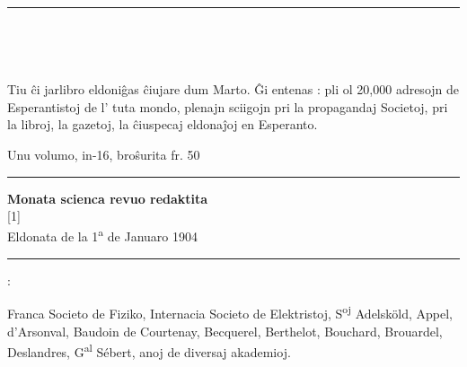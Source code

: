 %
%
\thispagestyle{plain}
{\centering
{\footnotesize {}\par}
\rule[0.9ex]{\textwidth}{0.4pt}

{}\\[1ex]
\parbox{0.7\textwidth}{}\\[1ex]
{\footnotesize{}}\par

{\par}
}

{\footnotesize Tiu ĉi jarlibro eldoniĝas ĉiujare dum Marto.  Ĝi entenas : pli ol 20,000 adresojn de Esperantistoj de l’ tuta mondo, plenajn sciigojn pri la propagandaj Societoj, pri la libroj, la gazetoj, la ĉiuspecaj eldonaĵoj en Esperanto.}

\newlength{\tempindent}
\setlength{\tempindent}{\parindent}
\setlength{\parindent}{0pt}
{\footnotesize Unu volumo, in-16, broŝurita  fr. 50}
\setlength{\parindent}{\tempindent}

{\centering
\rule[0.9ex]{\textwidth}{0.4pt}
{}

\vspace{1em}

{}

\vspace{1em}

{\small \bf Monata scienca revuo redaktita} \\
{\latin\scalebox{1.5}[1]{}} \\
{Eldonata de la 1\textsuperscript{a} de Januaro 1904}

\rule[0.9ex]{13mm}{0.4pt}

{ :\par}
}

{\footnotesize Franca Societo de Fiziko, Internacia Societo de Elektristoj, S\textsuperscript{oj} Adelsköld, Appel, d’Arsonval, Baudoin de Courtenay, Becquerel, Berthelot, Bouchard, Brouardel, Deslandres, G\textsuperscript{al} Sébert, anoj de diversaj akademioj.}

